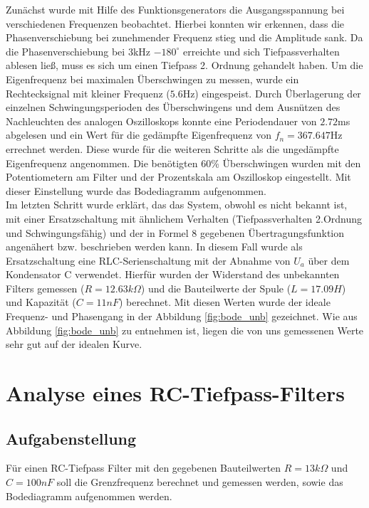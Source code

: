 \documentclass[12pt,a4paper,ngerman]{article}
\begin{document}
Zunächst wurde mit Hilfe des Funktionsgenerators die Ausgangsspannung bei verschiedenen Frequenzen beobachtet. Hierbei konnten wir erkennen, dass die Phasenverschiebung bei zunehmender Frequenz stieg und die Amplitude sank. Da die Phasenverschiebung bei 3kHz $-180^\circ$ erreichte und sich Tiefpassverhalten ablesen ließ, muss es sich um einen Tiefpass 2. Ordnung gehandelt haben.
Um die Eigenfrequenz bei maximalen Überschwingen zu messen, wurde ein Rechtecksignal mit kleiner Frequenz ($5.6$Hz) eingespeist. Durch Überlagerung der einzelnen Schwingungsperioden des Überschwingens und dem Ausnützen des Nachleuchten des analogen Oszilloskops konnte eine Periodendauer von $2.72$ms abgelesen und ein Wert für die gedämpfte Eigenfrequenz von $f_n = 367.647$Hz errechnet werden. Diese wurde für die weiteren Schritte als die ungedämpfte Eigenfrequenz angenommen.
Die benötigten 60\% Überschwingen wurden mit den Potentiometern am Filter und der Prozentskala am Oszilloskop eingestellt. Mit dieser Einstellung wurde das Bodediagramm aufgenommen.\\
Im letzten Schritt wurde erklärt, das das System, obwohl es nicht bekannt ist, mit einer Ersatzschaltung mit ähnlichem Verhalten (Tiefpassverhalten 2.Ordnung und Schwingungsfähig) und der in Formel 8 gegebenen Übertragungsfunktion angenähert bzw. beschrieben werden kann. In diesem Fall wurde als Ersatzschaltung eine RLC-Serienschaltung mit der Abnahme von $U_a$ über dem Kondensator C verwendet. Hierfür wurden der Widerstand des unbekannten Filters gemessen ($R = 12.63k\Omega$) und die Bauteilwerte der Spule ($L = 17.09H$) und Kapazität ($C = 11nF$) berechnet. Mit diesen Werten wurde der ideale Frequenz- und Phasengang in der Abbildung \ref{fig:bode_unb} gezeichnet. Wie aus Abbildung \ref{fig:bode_unb} zu entnehmen ist, liegen die von uns gemessenen Werte sehr gut auf der idealen Kurve.



\pagebreak
\section{Analyse eines RC-Tiefpass-Filters}
\subsection{Aufgabenstellung}
Für einen RC-Tiefpass Filter mit den gegebenen Bauteilwerten $R = 13k\Omega$ und $C = 100 nF$ soll die Grenzfrequenz berechnet und gemessen werden, sowie das Bodediagramm aufgenommen werden.
\end{document}

